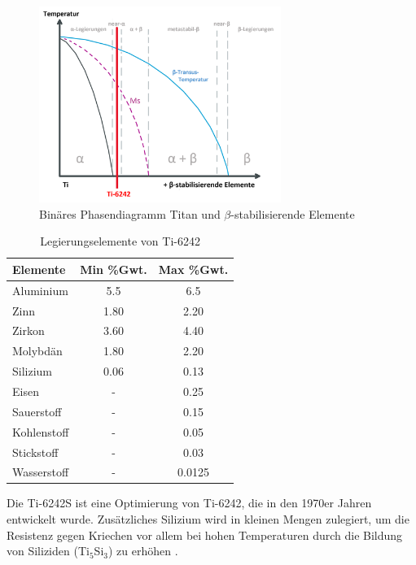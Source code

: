 \begin{figure}[H]
	\centering
	\includegraphics[width=0.7\textwidth]{Bilder/Phasendiagram}
	\caption{Binäres Phasendiagramm Titan und $\beta$-stabilisierende Elemente \cite{M.J.Donachie.2010}}
	\label{tab:PD-Ti6242}
\end{figure}





\begin{table}[h]
	
	\centering	
	\begin{tabular}{|l |c |c|}
		\hline
		\hspace{20ex}Elemente \hspace{20ex} & Min \%Gwt. & Max \%Gwt.\\
		\hline
		Aluminium&5.5&6.5\\
		Zinn&1.80&2.20\\
		Zirkon&3.60&4.40\\
		Molybdän&1.80&2.20\\
		Silizium &0.06&0.13\\
		Eisen&-&0.25\\
		Sauerstoff&-&0.15\\
		Kohlenstoff&	-&	0.05\\
		Stickstoff&-&0.03\\
		Wasserstoff&-&0.0125\\
		
		
		\hline
	\end{tabular}
	\caption{Legierungselemente von Ti-6242 \cite{M.J.Donachie.2010}}
	\label{tab:Zusammensetzung}
\end{table}


Die Ti-6242S ist eine Optimierung von Ti-6242, die in den 1970er Jahren  entwickelt wurde. Zusätzliches Silizium wird in kleinen Mengen zulegiert, um die Resistenz gegen Kriechen vor allem bei hohen Temperaturen durch die Bildung von Siliziden (Ti$_5$Si$_3$) zu erhöhen \cite{C.Leyens.2005}.

